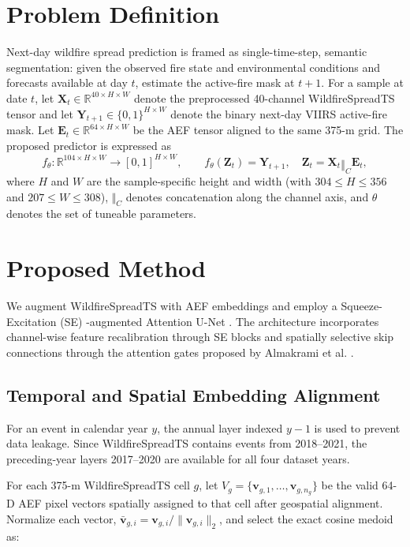 \documentclass[sigconf]{acmart}
\begin{document}
\section{Problem Definition}
Next-day wildfire spread prediction is framed as single-time-step, semantic segmentation: given the observed fire 
state and environmental conditions and forecasts available at day $t$, estimate the active-fire mask at $t+1$. For a sample at 
date $t$, let $\mathbf{X}_t \in \mathbb{R}^{40\times H\times W}$ denote the preprocessed 40-channel WildfireSpreadTS tensor and let 
$\mathbf{Y}_{t+1}\in\{0,1\}^{H\times W}$ denote the binary next-day VIIRS active-fire mask. Let 
$\mathbf{E}_t\in\mathbb{R}^{64\times H\times W}$ be the AEF tensor aligned to the same 375-m grid. The proposed predictor is expressed as
\begin{equation}
 f_\theta:\mathbb{R}^{104\times H\times W}\rightarrow[0,1]^{H\times W},\qquad
 f_\theta(\mathbf{Z}_t) = \widehat{\mathbf{Y}}_{t+1},\quad
 \mathbf{Z}_t = \mathbf{X}_t \mathbin{\Vert}_{C} \mathbf{E}_t,
 \label{eq:problem}
\end{equation}
where $H$ and $W$ are the sample-specific height and width (with $304\leq H\leq356$ and $207\leq W\leq308$), $\Vert_C$ denotes concatenation 
along the channel axis, and $\theta$ denotes the set of tuneable parameters.


\section{Proposed Method}
We augment WildfireSpreadTS with AEF embeddings and employ a Squeeze-Excitation (SE) \cite{SE2017}-augmented Attention U-Net \cite{almakrami}. 
The architecture incorporates 
channel-wise feature recalibration through SE blocks and spatially selective skip connections through the attention gates proposed by 
Almakrami et al. \cite{almakrami}.


\subsection{Temporal and Spatial Embedding Alignment}
For an event in calendar year $y$, the annual layer indexed $y-1$ is 
used to prevent data leakage. Since WildfireSpreadTS contains events from 2018--2021, the preceding-year layers 2017--2020 are available for 
all four dataset years.

For each 375-m WildfireSpreadTS cell $g$, let $V_g=\{\mathbf{v}_{g,1},\ldots,\mathbf{v}_{g,n_g}\}$ be the valid 64-D AEF pixel 
vectors spatially assigned to that cell after geospatial alignment. Normalize each vector, 
$\bar{\mathbf{v}}_{g,i}=\mathbf{v}_{g,i}/\|\mathbf{v}_{g,i}\|_2$, and select the exact cosine medoid as:
\end{document}
